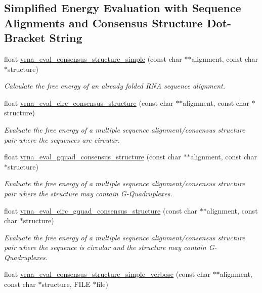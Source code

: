\subsection*{Simplified Energy Evaluation with Sequence Alignments and Consensus Structure Dot-\/\+Bracket String}
\begin{DoxyCompactItemize}
\item 
float \hyperlink{group__eval_ga7762c3a7bdcbc3a14ef93259d322c7d6}{vrna\+\_\+eval\+\_\+consensus\+\_\+structure\+\_\+simple} (const char $\ast$$\ast$alignment, const char $\ast$structure)
\begin{DoxyCompactList}\small\item\em Calculate the free energy of an already folded R\+NA sequence alignment. \end{DoxyCompactList}\item 
float \hyperlink{group__eval_gac96577cf232c71160f762737a994b7c6}{vrna\+\_\+eval\+\_\+circ\+\_\+consensus\+\_\+structure} (const char $\ast$$\ast$alignment, const char $\ast$structure)
\begin{DoxyCompactList}\small\item\em Evaluate the free energy of a multiple sequence alignment/consensus structure pair where the sequences are circular. \end{DoxyCompactList}\item 
float \hyperlink{group__eval_gaf09a326b3d57a4b30c27bd0e216198ac}{vrna\+\_\+eval\+\_\+gquad\+\_\+consensus\+\_\+structure} (const char $\ast$$\ast$alignment, const char $\ast$structure)
\begin{DoxyCompactList}\small\item\em Evaluate the free energy of a multiple sequence alignment/consensus structure pair where the structure may contain G-\/\+Quadruplexes. \end{DoxyCompactList}\item 
float \hyperlink{group__eval_gac673ebb9ae2a29f54d201e2ac5b85540}{vrna\+\_\+eval\+\_\+circ\+\_\+gquad\+\_\+consensus\+\_\+structure} (const char $\ast$$\ast$alignment, const char $\ast$structure)
\begin{DoxyCompactList}\small\item\em Evaluate the free energy of a multiple sequence alignment/consensus structure pair where the sequence is circular and the structure may contain G-\/\+Quadruplexes. \end{DoxyCompactList}\item 
float \hyperlink{group__eval_ga1c07851f6b665c3461a19e9e4eb33d26}{vrna\+\_\+eval\+\_\+consensus\+\_\+structure\+\_\+simple\+\_\+verbose} (const char $\ast$$\ast$alignment, const char $\ast$structure, F\+I\+LE $\ast$file)
$$
\end{DoxyCompactItemize}
